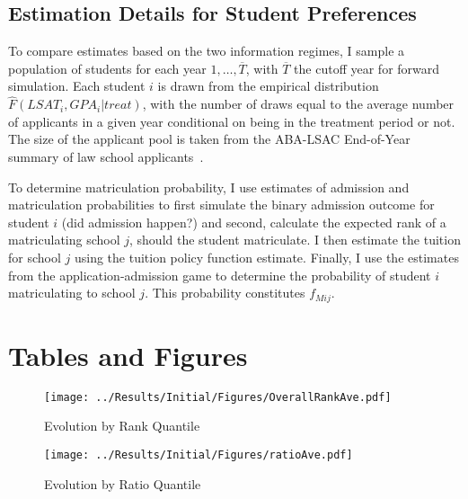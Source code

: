 \documentclass[12pt]{article}
\theoremstyle{definition}
\begin{document}
\subsection{Estimation Details for Student Preferences}
\label{app:est_outside}
To compare estimates based on the two information regimes, I sample a population of students for each year $1, \dots, \overline{T}$, with $\overline{T}$ the cutoff year for forward simulation. Each student $i$ is drawn from the empirical distribution $\hat{F}(LSAT_i, GPA_i | treat)$, with the number of draws equal to the average number of applicants in a given year conditional on being in the treatment period or not. The size of the applicant pool is taken from the ABA-LSAC End-of-Year summary of law school applicants~\cite{abaeoy}.

To determine matriculation probability, I use estimates of admission and matriculation probabilities to first simulate the binary admission outcome for student $i$ (did admission happen?) and second, calculate the expected rank of a matriculating school $j$, should the student matriculate. I then estimate the tuition for school $j$ using the tuition policy function estimate. Finally, I use the estimates from the application-admission game to determine the probability of student $i$ matriculating to school $j$. This probability constitutes $f_{Mij}$.

\section{Tables and Figures}
\label{app:tables_figures}




\clearpage

\begin{figure}[htbp]
  \begin{center}
    \texttt{[image: ../Results/Initial/Figures/OverallRankAve.pdf]}
    \caption{Evolution by Rank Quantile}
    \label{fig:rank_quantile}
  \end{center}
\end{figure}

\begin{figure}[htbp]
  \begin{center}
    \texttt{[image: ../Results/Initial/Figures/ratioAve.pdf]}
    \caption{Evolution by Ratio Quantile}
    \label{fig:ratio_quantile}
  \end{center}
\end{figure}
\clearpage
\end{document}
